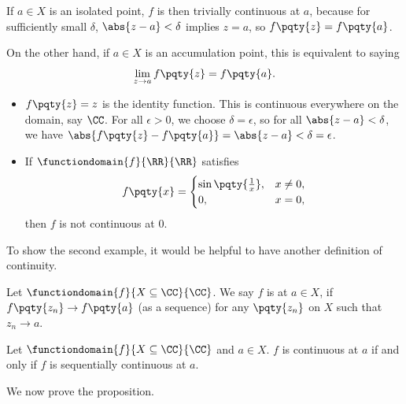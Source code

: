 \begin{remark}
    If \(a \in X\) is an isolated point, \(f\) is then trivially continuous at \(a\), because for sufficiently small \(\delta\), \(\abs{z - a} < \delta\) implies \(z = a\), so \(f\pqty{z} = f\pqty{a}\).

    On the other hand, if \(a \in X\) is an accumulation point, this is equivalent to saying
    \[
        \lim_{z \to a} f\pqty{z} = f\pqty{a}.
    \] 
\end{remark}

\begin{example}
    \label{ex:fn-continuity}
    \begin{itemize}
        \item \(f\pqty{z} = z\) is the identity function. This is continuous everywhere on the domain, say \(\CC\). For all \(\epsilon > 0\), we choose \(\delta = \epsilon\), so for all \(\abs{z - a} < \delta\), we have \(\abs{f\pqty{z} - f\pqty{a}} = \abs{z - a} < \delta = \epsilon\).

        \item If \(\functiondomain{f}{\RR}{\RR}\) satisfies \[
            f\pqty{x} = \begin{cases}
                \sin \pqty{\frac{1}{x}}, & x \neq 0, \\
                0, & x = 0,
            \end{cases}
        \]
        then \(f\) is not continuous at \(0\).
    \end{itemize}
\end{example}

To show the second example, it would be helpful to have another definition of continuity.

\begin{definition}
    \label{def:fn-sequential-continuous}%
    Let \(\functiondomain{f}{X \subseteq \CC}{\CC}\). We say \(f\) is  at \(a \in X\), if \(f\pqty{z_n} \to f\pqty{a}\) (as a sequence) for any \(\pqty{z_n}\) on \(X\) such that \(z_n \to a\).
\end{definition}

\begin{proposition}
    \label{prop:fn-seq-cont-iff-cont}%
    Let \(\functiondomain{f}{X \subseteq \CC}{\CC}\) and \(a \in X\). \(f\) is continuous at \(a\) if and only if \(f\) is sequentially continuous at \(a\).
\end{proposition}
We now prove the proposition.

